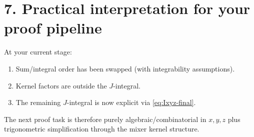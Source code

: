 \documentclass[11pt]{article}
\begin{document}
	\section*{7. Practical interpretation for your proof pipeline}
	At your current stage:
	\begin{enumerate}
		\item Sum/integral order has been swapped (with integrability assumptions).
		\item Kernel factors are outside the $J$-integral.
		\item The remaining $J$-integral is now explicit via \eqref{eq:Ixyz-final}.
	\end{enumerate}
	The next proof task is therefore purely algebraic/combinatorial in $x,y,z$ plus trigonometric simplification through the mixer kernel structure.
	
\end{document}
